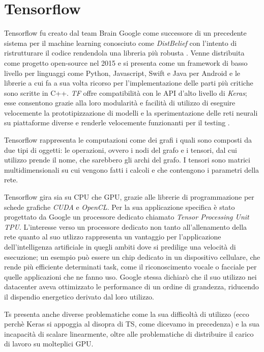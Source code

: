 \section{Tensorflow}
Tensorflow  fu creato dal team Brain Google come successore di un precedente sistema per il machine learning conosciuto come \textit{DistBelief} con l'intento di ristrutturare il codice rendendola una libreria più robusta \cite{wiki:tf}. Venne distribuita come progetto open-source nel 2015 e si presenta come un framework di basso livello \cite{oreilly:pytorch_intro} per linguaggi come Python, Javascript, Swift e Java per Android  e le librerie a cui fa a sua volta ricorso per l'implementazione delle parti più critiche sono scritte in C++. \textit{TF} offre compatibilità con le API d'alto livello di \textit{Keras}; esse consentono grazie alla loro modularità e facilità di utilizzo di eseguire velocemente la prototipizzazione di modelli e la sperimentazione delle reti neurali su piattaforme diverse e renderle velocemente funzionanti per il testing \cite{keras}.

Tensorflow rappresenta le computazioni come dei grafi i quali sono composti da due tipi di oggetti: le operazioni, ovvero i nodi del grafo e i tensori, dal cui utilizzo prende il nome, che sarebbero gli archi del grafo.
I tensori sono matrici multidimensionali su cui vengono fatti i calcoli e che contengono i parametri della rete.

Tensorflow gira sia su CPU che GPU, grazie alle librerie di programmazione per schede grafiche \textit{CUDA} e \textit{OpenCL}. Per la sua applicazione specifica è stato progettato da Google un processore dedicato chiamato \emph{Tensor Processing Unit} \textit{TPU}. L'interesse verso un processore dedicato non tanto all'allenamento della rete quanto al suo utlizzo rappresenta un vantaggio per l'applicazione dell'intelligenza artificiale in quegli ambiti dove si predilige una velocità di esecuzione; un esempio può essere un chip dedicato in un dispositivo cellulare, che rende più efficiente determinati task, come il riconoscimento vocale o facciale per quelle applicazioni che ne fanno uso. Google stessa dichiarò che il suo utilizzo nei datacenter aveva ottimizzato le performance di un ordine di grandezza, riducendo il dispendio energetico derivato dal loro utilizzo. 

Ts presenta anche diverse problematiche come la sua difficoltà di utilizzo (ecco perchè Keras si appoggia al disopra di TS, come dicevamo in precedenza) e la sua incapacità di scalare linearmente, oltre alle problematiche di distribuire il carico di lavoro su molteplici GPU\cite{quora:mxnet}.

